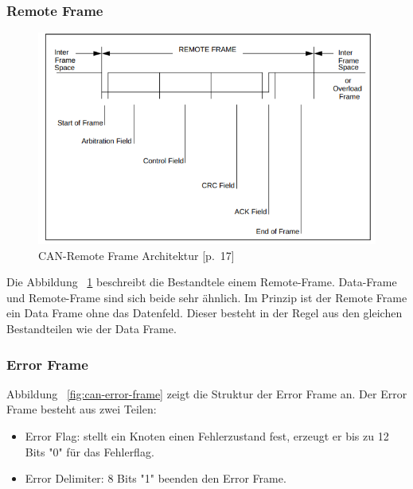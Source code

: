 \subsubsection{Remote Frame}
\begin{figure}[h]
	\begin{center}
		\includegraphics[width=1\textwidth]{./images/CAN-remote-frame.jpg}
	\end{center}
	\vspace{-5pt}
	\caption[CAN-Remote Frame Architektur]{CAN-Remote Frame Architektur \cite{Bosch1991}[p.~17]} %
	\label{fig:can-remote-frame}
	\vspace{-5pt}
\end{figure}
 Die Abbildung ~\ref{fig:can-remote-frame} beschreibt die Bestandtele einem Remote-Frame. Data-Frame und Remote-Frame sind sich beide sehr ähnlich. Im Prinzip ist der Remote Frame ein Data Frame ohne das Datenfeld. Dieser besteht in der Regel aus den gleichen Bestandteilen wie der Data Frame.
 
 \subsubsection{Error Frame}
 
 Abbildung ~\ref{fig:can-error-frame} zeigt die Struktur der Error Frame an. Der Error Frame besteht aus zwei Teilen:
 \begin{itemize}
 	\item Error Flag: stellt ein Knoten einen Fehlerzustand fest, erzeugt er bis zu 12 Bits "0" für das Fehlerflag.
 	\item Error Delimiter: 8 Bits "1" beenden den Error Frame.
 \end{itemize}
 
